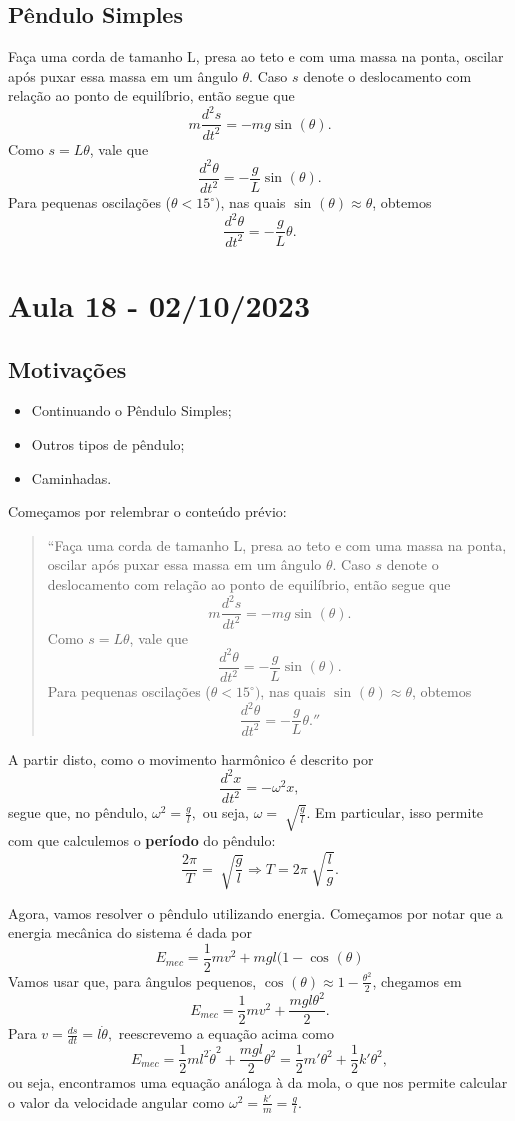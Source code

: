 \documentclass{article}
\begin{document}
\subsection{Pêndulo Simples}
Faça uma corda de tamanho L, presa ao teto e com uma massa na ponta, oscilar após puxar essa massa em um ângulo \(\theta \).
Caso \(s\) denote o deslocamento com relação ao ponto de equilíbrio, então segue que 
\[
  m \frac{d^{2}s}{dt^{2}} = -mg\sin^{}{(\theta )}.
\]
Como \(s = L\theta \), vale que 
\[
  \frac{d^{2}\theta }{dt^{2}}=-\frac{g}{L}\sin^{}{(\theta )}.
\]
Para pequenas oscilações (\(\theta < 15^{\circ})\), nas quais \(\sin^{}{(\theta )}\approx \theta \), obtemos 
\[
  \frac{d^{2}\theta }{dt^{2}} = -\frac{g}{L}\theta .
\]
\newpage

\section{Aula 18 - 02/10/2023}
\subsection{Motivações}
\begin{itemize}
  \item Continuando o Pêndulo Simples;
  \item Outros tipos de pêndulo;
  \item Caminhadas.
\end{itemize}
Começamos por relembrar o conteúdo prévio:
\begin{quote}``Faça uma corda de tamanho L, presa ao teto e com uma massa na ponta, oscilar após puxar essa massa em um ângulo \(\theta \).
  Caso \(s\) denote o deslocamento com relação ao ponto de equilíbrio, então segue que 
  \[
    m \frac{d^{2}s}{dt^{2}} = -mg\sin^{}{(\theta )}.
  \]
  Como \(s = L\theta \), vale que 
  \[
    \frac{d^{2}\theta }{dt^{2}}=-\frac{g}{L}\sin^{}{(\theta )}.
  \]
  Para pequenas oscilações (\(\theta < 15^{\circ})\), nas quais \(\sin^{}{(\theta )}\approx \theta \), obtemos 
  \[
    \frac{d^{2}\theta }{dt^{2}} = -\frac{g}{L}\theta .''
  \]
\end{quote}
A partir disto, como o movimento harmônico é descrito por 
\[
  \frac{d^{2}x}{dt^{2}}=-\omega^{2}x,
\]
segue que, no pêndulo, \(\omega^{2}=\frac{g}{l},\) ou seja, \(\omega = \sqrt[]{\frac{g}{l}}.\)
Em particular, isso permite com que calculemos o \textbf{período} do pêndulo: 
\[
  \frac{2\pi }{T} = \sqrt[]{\frac{g}{l}} \Rightarrow T = 2\pi \sqrt[]{\frac{l}{g}}.
\]

Agora, vamos resolver o pêndulo utilizando energia. Começamos por notar que a energia mecânica do sistema é dada por 
\[
  E_{mec} = \frac{1}{2}mv^{2} + mgl(1-\cos^{}{(\theta )}
\]
Vamos usar que, para ângulos pequenos, \(\cos^{}{(\theta )}\approx 1-\frac{\theta ^{2}}{2} \), chegamos em
\[
  E_{mec} = \frac{1}{2}mv^{2}+\frac{mgl\theta ^{2}}{2}.  
\]
Para \(v=\frac{ds}{dt} = l\dot \theta ,\) reescrevemo a equação acima como 
\[
  E_{mec} = \frac{1}{2}ml^{2}\dot\theta ^{2} + \frac{mgl}{2}\theta^{2} = \frac{1}{2}m'\theta ^{2} + \frac{1}{2}k'\theta ^{2},
\]
ou seja, encontramos uma equação análoga à da mola, o que nos permite calcular o valor da velocidade angular como \(\omega^{2}=\frac{k'}{m} = \frac{g}{l}.\)
\end{document}
